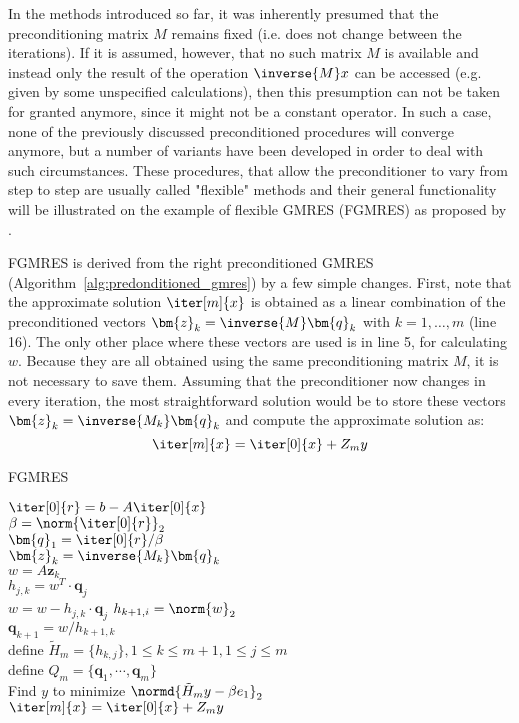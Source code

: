 In the methods introduced so far, it was inherently presumed that the preconditioning matrix $M$ remains fixed (i.e. does not change between the iterations). If it is assumed, however, that no such matrix $M$ is available and instead only the result of the operation $\inverse{M}x$ can be accessed (e.g. given by some unspecified calculations), then this presumption can not be taken for granted anymore, since it might not be a constant operator. In such a case, none of the previously discussed preconditioned procedures will converge anymore, but a number of variants have been developed in order to deal with such circumstances. These procedures, that allow the preconditioner to vary from step to step are usually called "flexible" methods and their general functionality will be illustrated on the example of flexible GMRES (FGMRES) as proposed by \cite{saad_flexible_1993}.

FGMRES is derived from the right preconditioned GMRES (Algorithm~\hyperref[alg:predonditioned_gmres]{\ref{alg:predonditioned_gmres}}) by a few simple changes. First, note that the approximate solution $\iter[m]{x}$ is obtained as a linear combination of the preconditioned vectors $\bm{z}_k=\inverse{M}\bm{q}_k$ with $k=1,\dots, m$ (line 16). The only other place where these vectors are used is in line 5, for calculating $w$. Because they are all obtained using the same preconditioning matrix $M$, it is not necessary to save them. Assuming that the preconditioner now changes in every iteration, the most straightforward solution would be to store these vectors $\bm{z}_k=\inverse{M_k}\bm{q}_k$ and compute the approximate solution as:
\begin{equation}
    \iter[m]{x}= \iter[0]{x}+Z_my
\end{equation}

\begin{algorithm}[h]
  \caption{FGMRES}
  \label{alg:fgmres}
  \SetAlgoLined
  \DontPrintSemicolon
  $\iter[0]{r} = b-A\iter[0]{x}$ \\
  $\beta = \norm{\iter[0]{r}}_2$ \\
  $\bm{q}_1 = \iter[0]{r}/\beta$ \\
   {
    $\bm{z}_k = \inverse{M_k}\bm{q}_k$ \\
    $w =A \bm{z}_k$ \\
     {
      $h_{j,k} = w^T\cdot \bm{q}_j$ \\
      $ w = w - h_{j,k}\cdot \bm{q}_j$}
    $h_{k+1,i} = \norm{w}_2$ \\
    $\bm{q}_{k+1} = w/h_{k+1,k}$ \\
  }
  define $\tilde{H}_m = \{h_{k,j}\}, 1 \leq k \leq m+1, 1 \leq j \leq m$ \\
  define $Q_m = \{\bm{q}_1, \cdots, \bm{q}_m\}$ \\
  Find $y$ to minimize $\normd{\tilde{H}_my-\beta e_1}_2$ \\
  $\iter[m]{x} = \iter[0]{x} + Z_my$
\end{algorithm}

